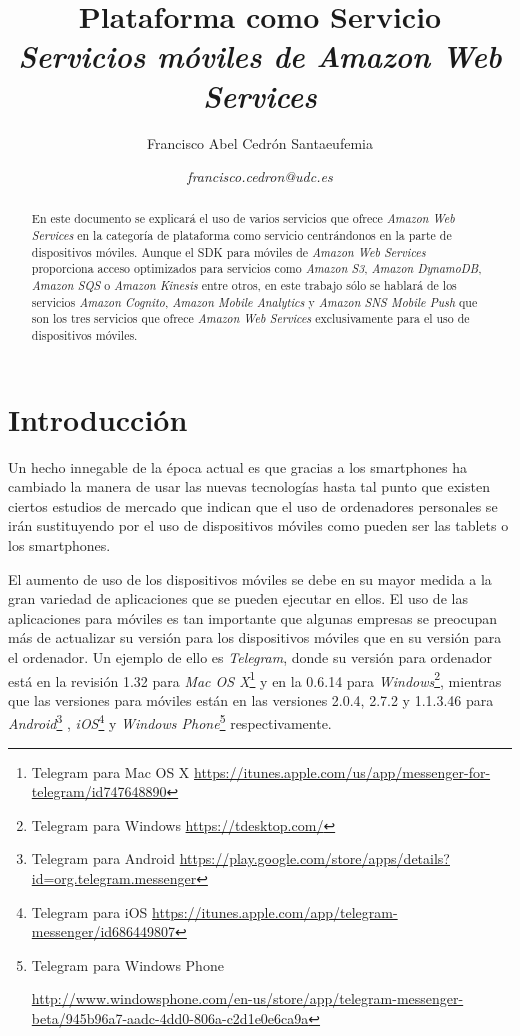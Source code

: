 \documentclass{article}
\title{\textbf{Plataforma como Servicio}
\\ \textbf{\emph{Servicios móviles de Amazon Web Services}}
}
\author{Francisco Abel Cedrón Santaeufemia \and \textit{francisco.cedron@udc.es}}
\date{} %
\begin{document}
\maketitle %
\renewcommand{\abstractname}{Abstract} %
\begin{abstract}
En este documento se explicará el uso de varios servicios que ofrece \emph{Amazon Web Services} en la categoría de plataforma como servicio centrándonos en la parte de dispositivos móviles. Aunque el SDK para móviles de \emph{Amazon Web Services} proporciona acceso optimizados para servicios como \emph{Amazon S3}, \emph{Amazon DynamoDB}, \emph{Amazon SQS} o \emph{Amazon Kinesis} entre otros, en este trabajo sólo se hablará de los servicios \emph{Amazon Cognito}, \emph{Amazon Mobile Analytics} y \emph{Amazon SNS Mobile Push} que son los tres servicios que ofrece \emph{Amazon Web Services} exclusivamente para el uso de dispositivos móviles.
\end{abstract}
\renewcommand{\contentsname}{} %
{\setlength{\parskip}{0mm} \tableofcontents} %

\newpage

\section{Introducción}
	Un hecho innegable de la época actual es que gracias a los smartphones ha cambiado la manera de usar las nuevas tecnologías hasta tal punto que existen ciertos estudios de mercado que indican que el uso de ordenadores personales se irán sustituyendo por el uso de dispositivos móviles como pueden ser las tablets o los smartphones.

	El aumento de uso de los dispositivos móviles se debe en su mayor medida a la gran variedad de aplicaciones que se pueden ejecutar en ellos. El uso de las aplicaciones para móviles es tan importante que algunas empresas se preocupan más de actualizar su versión para los dispositivos móviles que en su versión para el ordenador. Un ejemplo de ello es \emph{Telegram}, donde su versión para ordenador está en la revisión 1.32 para \emph{Mac OS X}\footnote{
Telegram para Mac OS X	\url{https://itunes.apple.com/us/app/messenger-for-telegram/id747648890}}
y en la 0.6.14 para \emph{Windows}\footnote{
Telegram para Windows \url{https://tdesktop.com/}}, 
mientras que las versiones para móviles están en las versiones 2.0.4, 2.7.2 y 1.1.3.46 para \emph{Android}\footnote{
Telegram para Android \url{https://play.google.com/store/apps/details?id=org.telegram.messenger}}
, \emph{iOS}\footnote{
Telegram para iOS \url{https://itunes.apple.com/app/telegram-messenger/id686449807}}
y \emph{Windows Phone}\footnote{
Telegram para Windows Phone

\url{http://www.windowsphone.com/en-us/store/app/telegram-messenger-beta/945b96a7-aadc-4dd0-806a-c2d1e0e6ca9a}}
respectivamente.
\end{document}

